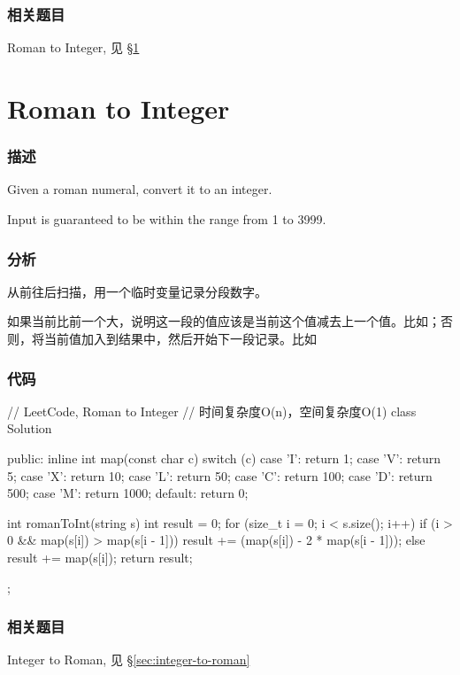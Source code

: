 \subsubsection{相关题目}
\begindot
\item Roman to Integer, 见 \S \ref{sec:roman-to-integer}
\myenddot


\section{Roman to Integer} %
\label{sec:roman-to-integer}


\subsubsection{描述}
Given a roman numeral, convert it to an integer.

Input is guaranteed to be within the range from 1 to 3999.


\subsubsection{分析}
从前往后扫描，用一个临时变量记录分段数字。

如果当前比前一个大，说明这一段的值应该是当前这个值减去上一个值。比如；否则，将当前值加入到结果中，然后开始下一段记录。比如


\subsubsection{代码}
\begin{Code}
// LeetCode, Roman to Integer
// 时间复杂度O(n)，空间复杂度O(1)
class Solution {
public:
    inline int map(const char c) {
        switch (c) {
        case 'I': return 1;
        case 'V': return 5;
        case 'X': return 10;
        case 'L': return 50;
        case 'C': return 100;
        case 'D': return 500;
        case 'M': return 1000;
        default: return 0;
        }
    }

    int romanToInt(string s) {
        int result = 0;
        for (size_t i = 0; i < s.size(); i++) {
            if (i > 0 && map(s[i]) > map(s[i - 1])) {
                result += (map(s[i]) - 2 * map(s[i - 1]));
            } else {
                result += map(s[i]);
            }
        }
        return result;
    }
};
\end{Code}


\subsubsection{相关题目}
\begindot
\item Integer to Roman, 见 \S \ref{sec:integer-to-roman}
\myenddot


